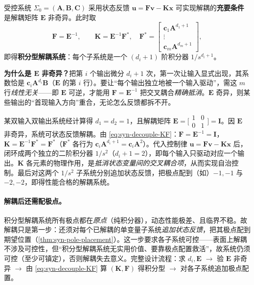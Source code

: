 \begin{theorem}[可解耦判据]
\label{thm:syn-decouple}
受控系统 $\Sigma_0=(\mathbf A,\mathbf B,\mathbf C)$ 采用状态反馈 $\mathbf u=\mathbf F\mathbf v-\mathbf K\mathbf x$ 可实现解耦的\textbf{充要条件}是解耦矩阵 $\mathbf E$ 非奇异\cite{liubao2006modern,zhang2017modern}。此时取
\begin{equation}
  \mathbf F=\mathbf E^{-1},\qquad \mathbf K=\mathbf E^{-1}\mathbf F^*,\quad \mathbf F^*=\begin{bmatrix}\mathbf c_1\mathbf A^{d_1+1}\\\vdots\\\mathbf c_m\mathbf A^{d_m+1}\end{bmatrix},
  \label{eq:syn-decouple-KF}
\end{equation}
即得\textbf{积分型解耦系统}：每个子系统是一个 $(d_i+1)$ 阶积分器 $1/s^{d_i+1}$。
\end{theorem}

\begin{insight}
\textbf{为什么是 $\mathbf E$ 非奇异？}\;把第 $i$ 个输出微分 $d_i+1$ 次，第一次让输入显式出现，其系数恰是 $\mathbf c_i\mathbf A^{d_i}\mathbf B$（$\mathbf E$ 的第 $i$ 行）。要让“每个输出独立地被一个输入驱动”，需这 $m$ 行\emph{线性无关}——即 $\mathbf E$ 可逆，才能用 $\mathbf F=\mathbf E^{-1}$ 把交叉耦合\emph{精确抵消}。$\mathbf E$ 奇异，则某些输出的“首现输入方向”重合，无论怎么反馈都拆不开。
\end{insight}

\begin{example}[状态反馈解耦设计]
\label{ex:syn-decouple}
某双输入双输出系统经计算得 $d_1=d_2=1$，且解耦矩阵 $\mathbf E=\big[\begin{smallmatrix}1&0\\0&1\end{smallmatrix}\big]=\mathbf I$\cite{liubao2006modern}。因 $\mathbf E$ 非奇异，系统可状态反馈解耦。由 \cref{eq:syn-decouple-KF}：$\mathbf F=\mathbf E^{-1}=\mathbf I$，$\mathbf K=\mathbf E^{-1}\mathbf F^*=\mathbf F^*$（$\mathbf F^*$ 各行为 $\mathbf c_i\mathbf A^{d_i+1}=\mathbf c_i\mathbf A^2$）。代入控制律 $\mathbf u=\mathbf F\mathbf v-\mathbf K\mathbf x$ 后，闭环成两个独立的二阶积分器 $1/s^2$（$d_i+1=2$），即每个输入只驱动对应一个输出。$\mathbf K$ 各元素的物理作用，是\emph{抵消状态变量间的交叉耦合项}，从而实现自治控制。最后对这两个 $1/s^2$ 子系统分别追加状态反馈，把极点配到（如）$-1,-1$ 与 $-2,-2$，即得性能合格的解耦系统。
\end{example}

\paragraph{解耦后还需配极点。}
积分型解耦系统所有极点都在\emph{原点}（纯积分器），动态性能极差、且临界不稳。故解耦只是第一步：还须对每个已解耦的单变量子系统\emph{追加状态反馈}，把其极点配到期望位置（\cref{thm:syn-pole-placement}）。这一步要求各子系统可控——表面上解耦不涉及可控性，但“积分型解耦系统无实用价值、要靠极点配置救活”，故系统仍须可控（至少可镇定），否则解耦失去意义\cite{zhang2017modern}。完整设计流程：求 $d_i,\mathbf E$ $\to$ 验 $\mathbf E$ 非奇异 $\to$ 由 \cref{eq:syn-decouple-KF} 算 $(\mathbf K,\mathbf F)$ 得积分型 $\to$ 对各子系统追加极点配置。

